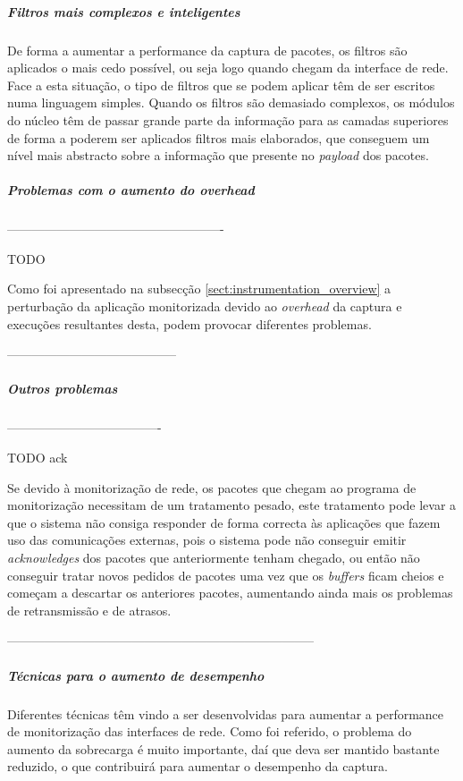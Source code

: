 \subparagraph*{Filtros mais complexos e inteligentes}
De forma a aumentar a performance da captura de pacotes, os filtros são aplicados o mais cedo possível, ou seja logo quando chegam da interface de rede.
Face a esta situação, o tipo de filtros que se podem aplicar têm de ser escritos numa linguagem simples.
Quando os filtros são demasiado complexos, os módulos do núcleo têm de passar grande parte da informação para as camadas superiores de forma a poderem ser aplicados filtros mais elaborados, que conseguem um nível mais abstracto sobre a informação que presente no \textit{payload} dos pacotes.


\subparagraph*{Problemas com o aumento do overhead}

----------------------------------------------------

TODO

Como foi apresentado na subsecção \ref{sect:instrumentation_overview} a perturbação da aplicação monitorizada devido ao \textit{overhead} da captura e execuções resultantes desta, podem provocar diferentes problemas.

-----------------------------------------

\subparagraph*{Outros problemas
}

-------------------------------------

TODO ack

Se devido à monitorização de rede, os pacotes que chegam ao programa de monitorização necessitam de um tratamento pesado, este tratamento pode levar a que o sistema não consiga responder de forma correcta às aplicações que fazem uso das comunicações externas, pois o sistema pode não conseguir emitir \textit{acknowledges} dos pacotes que anteriormente tenham chegado, ou então não conseguir tratar novos pedidos de pacotes uma vez que os \textit{buffers} ficam cheios e começam a descartar os anteriores pacotes, aumentando ainda mais os problemas de retransmissão e de atrasos.

--------------------------------------------------------------------------

\subparagraph*{Técnicas para o aumento de desempenho}
Diferentes técnicas têm vindo a ser desenvolvidas para aumentar a performance de monitorização das interfaces de rede.
Como foi referido, o problema do aumento da sobrecarga é muito importante, daí que deva ser mantido bastante reduzido, o que contribuirá para aumentar o desempenho da captura.

